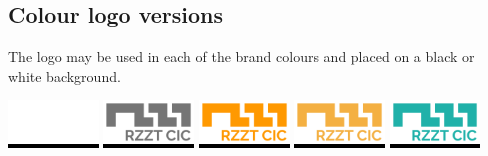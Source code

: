 \documentclass[a4paper,10pt]{article}
\begin{document}
\setlength{\parskip}{1em}

\subsection{Colour logo versions}

The logo may be used in each of the brand colours and placed on a black or white background.

\colorbox{Black}{\includegraphics[width=0.18\textwidth]{logo-white.png}}\hspace{\fill}%
\colorbox{Black}{\includegraphics[width=0.18\textwidth]{logo-grey.png}}\hspace{\fill}%
\colorbox{Black}{\includegraphics[width=0.18\textwidth]{logo-orange.png}}\hspace{\fill}%
\colorbox{Black}{\includegraphics[width=0.18\textwidth]{logo-amber.png}}\hspace{\fill}%
\colorbox{Black}{\includegraphics[width=0.18\textwidth]{logo-turquoise.png}}%

\setlength{\parskip}{0.005\textwidth}
\end{document}
